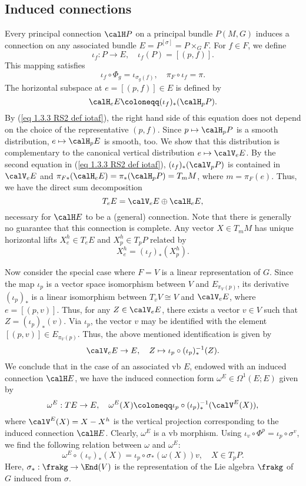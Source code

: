 \subsection{Induced connections}


Every principal connection $\calH P$ on a principal bundle $P(M,G)$ induces a connection on any associated bundle $E=P^{[\sigma]}=P\times_G F$. For $f\in F$, we define
\[\iota_f:P\to E,\quad \iota_f(P)=[(p,f)].\label{eq 1.3.3 RS2 def iotaf}\]
This mapping satisfies 
\[\iota_f\circ \Phi_g=\iota_{\sigma_g(f)},\quad \pi_F\circ\iota_f=\pi.\]
The horizontal subspace at $e=[(p,f)]\in E$ is defined by
\[\calH_eE\coloneqq (\iota_f)_\ast (\calH_pP).\label{eq 1.3.4 RS2}\]
By (\ref{eq 1.3.3 RS2 def iotaf}), the right hand side of this equation does not depend on the choice of the representative $(p,f)$. Since $p\mapsto \calH_pP$ is a smooth distribution, $e\mapsto \calH_pE$ is smooth, too. We show that this distribution is complementary to the canonical vertical distribution $e\mapsto \calV_eE$. By the second equation in (\ref{eq 1.3.3 RS2 def iotaf}), $(\iota_f)_\ast(\calV_pP)$ is contained in $\calV_eE$ and $\pi_{F\ast}(\calH_eE)=\pi_\ast(\calH_pP)=T_mM$, where $m=\pi_F(e)$. Thus, we have the direct sum decomposition 
\[T_eE=\calV_eE\oplus \calH_eE,\]
necessary for $\calH E$ to be a (general) connection. Note that there is generally no guarantee that this connection is complete. Any vector $X\in T_mM$ has unique horizontal lifts $X_e^h\in T_eE$ and $X_p^h\in T_pP$ related by
\[X^h_e=(\iota_f)_\ast(X^h_p).\label{eq 1.3.5 RS2}\]

Now consider the special case where $F=V$ is a linear representation of $G$. Since the map $\iota_p$ is a vector space isomorphism between $V$ and $E_{\pi_V(p)}$, its derivative $(\iota_p)_\ast$ is a linear isomorphism between $T_vV\cong V$ and $\calV_eE$, where $e=[(p,v)]$. Thus, for any $Z\in \calV_eE$, there exists a vector $v\in V$ such that $Z=(\iota_p)_\ast(v)$. Via $\iota_p$, the vector $v$ may  be identified with the element $[(p,v)]\in E_{\pi_V(p)}$. Thus, the above mentioned identification is given by 
\[\calV_eE\to E,\quad Z\mapsto \iota_p\circ (\iota_p)_\ast^{-1}(Z).\]
We conclude that in the case of an associated \gls{vb} $E$, endowed with an induced connection $\calH E$, we have the induced connection form $\omega^E\in\Omega^1(E;E)$ given by
\[\omega^E:TE\to E,\quad \omega^E(X)\coloneqq \iota_p\circ (\iota_p)_\ast^{-1}(\calV^E(X)),\label{eq 1.3.9 RS2}\]
where $\calV^E(X)=X-X^h$ is the vertical projection corresponding to the induced connection $\calH E$. Clearly, $\omega^E$ is a \gls{vb} morphism. Using $\iota_v\circ \Phi^p=\iota_p\circ\sigma^v$, we find the following relation between $\omega$ and $\omega^E$:
\[\omega^E\circ (\iota_v)_\ast(X)=\iota_p\circ \sigma_{\ast}(\omega(X))v,\quad X\in T_pP.\]
Here, $\sigma_{\ast}:\frakg\to \End(V)$ is the representation of the Lie algebra $\frakg$ of $G$ induced from $\sigma$.

